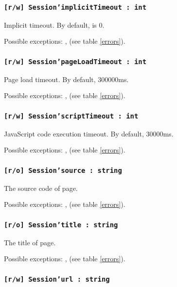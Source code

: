 \subsubsection{\texttt{[r/w] Session'implicitTimeout : int}}

Implicit timeout. By default, is 0.

Possible exceptions: ,  (see table \ref{errors}).

\subsubsection{\texttt{[r/w] Session'pageLoadTimeout : int}}

Page load timeout. By default, 300000ms.

Possible exceptions: ,  (see table \ref{errors}).

\subsubsection{\texttt{[r/w] Session'scriptTimeout : int}}

JavaScript code execution timeout. By default, 30000ms.

Possible exceptions: ,  (see table \ref{errors}).

\subsubsection{\texttt{[r/o] Session'source : string}}

The source code of page.

Possible exceptions: ,  (see table \ref{errors}).

\subsubsection{\texttt{[r/o] Session'title : string}}

The title of page.

Possible exceptions: ,  (see table \ref{errors}).

\subsubsection{\texttt{[r/w] Session'url : string}}

